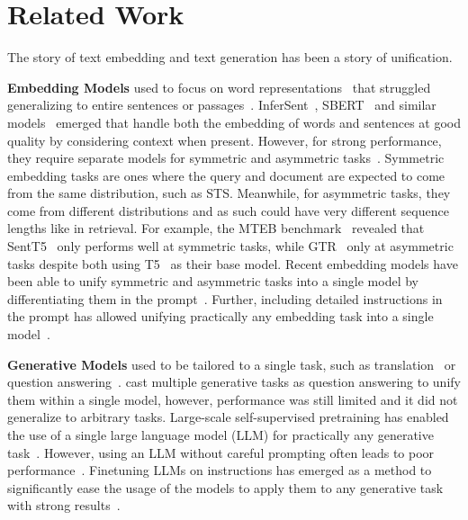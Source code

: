\documentclass{article}
\begin{document}
\section{Related Work}

The story of text embedding and text generation has been a story of unification.

\textbf{Embedding Models} used to focus on word representations~\cite{pennington2014glove,mikolov2013distributed} that struggled generalizing to entire sentences or passages~\cite{conneau2018senteval}. InferSent~\cite{conneau2018supervised}, SBERT~\cite{reimers2019sentencebert} and similar models~\cite{ni2021sentencet5,ni2021large} emerged that handle both the embedding of words and sentences at good quality by considering context when present. However, for strong performance, they require separate models for symmetric and asymmetric tasks~\cite{muennighoff2023mteb,muennighoff2022sgpt}. Symmetric embedding tasks are ones where the query and document are expected to come from the same distribution, such as STS. Meanwhile, for asymmetric tasks, they come from different distributions and as such could have very different sequence lengths like in retrieval. For example, the MTEB benchmark~\cite{muennighoff2023mteb} revealed that SentT5~\cite{ni2021sentencet5} only performs well at symmetric tasks, while GTR~\cite{ni2021large} only at asymmetric tasks despite both using T5~\cite{raffel2023exploring} as their base model. Recent embedding models have been able to unify symmetric and asymmetric tasks into a single model by differentiating them in the prompt~\cite{xiao2023cpack,wang2022text}. Further, including detailed instructions in the prompt has allowed unifying practically any embedding task into a single model~\cite{su2023embedder}.

\textbf{Generative Models} used to be tailored to a single task, such as translation~\cite{sutskever2014sequence} or question answering~\cite{yin2016neural}. \citet{mccann2018natural} cast multiple generative tasks as question answering to unify them within a single model, however, performance was still limited and it did not generalize to arbitrary tasks. Large-scale self-supervised pretraining has enabled the use of a single large language model (LLM) for practically any generative task~\cite{brown2020language,chowdhery2022palm,rae2022scaling,workshop2023bloom,scao2022language,groeneveld2024olmo,soldaini2024dolma,allal2023santacoder,li2023starcoder}. However, using an LLM without careful prompting often leads to poor performance~\cite{rubin2022learning,min2022rethinking}. Finetuning LLMs on instructions has emerged as a method to significantly ease the usage of the models to apply them to any generative task with strong results~\cite{wei2022finetuned,sanh2022multitask,min2022metaicl,wang2022supernaturalinstructions,mishra2022crosstask,muennighoff2023crosslingual,iyer2023optiml,üstün2024aya,singh2024aya,zhou2023lima}.
\end{document}
